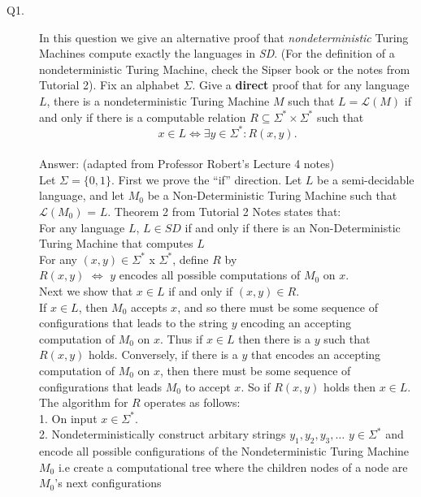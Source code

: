 \documentclass{csc_assignment}
\begin{document}
\begin{description}

\newpage
\item[Q1.]

In this question we give an alternative proof that \emph{nondeterministic} Turing Machines compute exactly the languages in \emph{SD}.
  (For the definition of a nondeterministic Turing Machine, check the Sipser book or the notes from Tutorial 2).
  Fix an alphabet $\Sigma$.
  Give a {\bf direct} proof that for any language $L$, there is a nondeterministic Turing Machine $M$ such that $L = \mathcal{L}(M)$ if and only if there is a computable relation $R \subseteq \Sigma^* \times \Sigma^*$ such that \[ x \in L \Leftrightarrow \exists y \in \Sigma^*: R(x, y).\] \\
  Answer: (adapted from Professor Robert's Lecture 4 notes) \\ Let $\Sigma = \{0,1\}$. First we prove the ``if'' direction. Let $L$ be a semi-decidable language, and let $M_0$ be a
Non-Deterministic Turing Machine such that $\mathcal{L}(M_0)$ = $L$. Theorem 2 from Tutorial 2 Notes states that: \\For any language $L$, $L \in SD$ if and only if there is an Non-Deterministic Turing Machine that computes $L$  \\ For any $(x, y) \in \Sigma^*$ x $\Sigma^*$, define $R$ by \\ $R(x, y)$ $\Leftrightarrow$ $y$ encodes all possible computations of $M_0$ on $x$.\\[2pt]
Next we show that $x \in L$ if and only if $(x, y) \in R$.\\
If $x \in L$, then $M_0$ accepts $x$, and so there must be some sequence of configurations that leads to the string $y$ encoding an accepting computation of $M_0$ on $x$. Thus if $x \in L$ then there is a $y$ such that $R(x, y)$ holds. Conversely, if there is a $y$ that encodes an accepting computation of $M_0$ on $x$, then there must be some sequence of configurations that leads $M_0$ to accept $x$. So if $R(x, y)$ holds then $x \in L$.\\[2pt]
The algorithm for $R$ operates as follows:\\[1pt]
1. On input $x \in \Sigma^*$.\\
2. Nondeterministically construct arbitary strings $y_1, y_2, y_3, \ldots$ $y \in \Sigma^{*}$ and encode all possible configurations of the Nondeterministic Turing Machine $M_0$ i.e create a computational tree where the children nodes of a node are $M_{0}$'s next configurations\\

\end{description}
\end{document}
